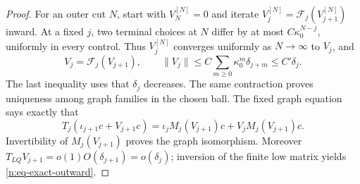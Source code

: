 \begin{proof}
For an outer cut \(N\), start with \(V_N^{[N]}=0\) and iterate
\(V_j^{[N]}=\mathcal F_j(V_{j+1}^{[N]})\) inward.  At a fixed \(j\),
two terminal choices at \(N\) differ by at most
\(C\kappa_0^{N-j}\), uniformly in every control.  Thus \(V_j^{[N]}\)
converges uniformly as \(N\to\infty\) to \(V_j\), and
\[
 V_j=\mathcal F_j(V_{j+1}),\qquad
 \|V_j\|\leq C\sum_{m\geq0}\kappa_0^m\delta_{j+m}
 \leq C'\delta_j.
\]
The last inequality uses that \(\delta_j\) decreases.  The same contraction
proves uniqueness among graph families in the chosen ball.
The fixed graph equation says exactly that
\begin{equation}
 T_j(\iota_{j+1}c+V_{j+1}c)
   =\iota_jM_j(V_{j+1})c+V_jM_j(V_{j+1})c .
 \label{n:eq-graph-identity}
\end{equation}
Invertibility of \(M_j(V_{j+1})\) proves the graph isomorphism.
Moreover \(T_{LQ}V_{j+1}=o(1)O(\delta_{j+1})=o(\delta_j)\);
inversion of the finite low matrix yields \eqref{n:eq-exact-outward}.


\end{proof}
